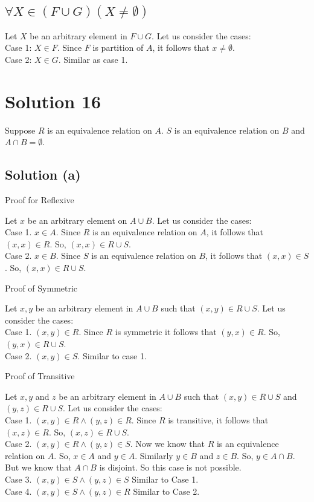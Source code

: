 \documentclass{article}
\begin{document}
\subsection{$\forall X \in (F \cup G)(X \neq \emptyset)$}
Let $X$ be an arbitrary element in $F \cup G$. Let us consider the
cases:
\\ Case 1: $X \in F$. Since $F$ is partition of $A$, it follows that $x
\neq \emptyset$.
\\ Case 2: $X \in G$. Similar as case 1.

\section{Solution 16}
Suppose $R$ is an equivalence relation on $A$. $S$ is an equivalence
relation on $B$ and $A \cap B = \emptyset$.
\subsection{Solution (a)}

Proof for Reflexive

Let $x$ be an arbitrary element on $A \cup B$. Let us consider the
cases:
\\ Case 1. $x \in A$. Since $R$ is an equivalence relation on $A$, it
follows that $(x,x) \in R$. So, $(x,x) \in R \cup S$.
\\ Case 2. $x \in B$. Since $S$ is an equivalence relation on $B$, it
follows that $(x,x) \in S$. So, $(x,x) \in R \cup S$.

\noindent
Proof of Symmetric

Let $x,y$ be an arbitrary element in $A \cup B$ such that $(x,y) \in R
\cup S$. Let us consider the cases:
\\ Case 1. $(x,y) \in R$. Since $R$ is symmetric it follows that
$(y,x) \in R$. So, $(y,x) \in R \cup S$.
\\ Case 2. $(x,y) \in S$. Similar to case 1.

\noindent
Proof of Transitive

Let $x,y$ and $z$ be an arbitrary element in $A \cup B$ such that
$(x,y) \in R \cup S$ and $(y,z) \in R \cup S$. Let us consider the
cases:
\\ Case 1. $(x,y) \in R \land (y,z) \in R$. Since $R$ is transitive,
it follows that $(x,z) \in R$. So, $(x,z) \in R \cup S$.
\\ Case 2. $(x,y) \in R \land (y,z) \in S$. Now we know that $R$ is an
equivalence relation on $A$. So, $x \in A$ and $y \in A$. Similarly $y
\in B$ and $z \in B$. So, $y \in A \cap B$. But we know that $A \cap
B$ is disjoint. So this case is not possible.
\\ Case 3. $(x,y) \in S \land (y,z) \in S$ Similar to Case 1.
\\ Case 4. $(x,y) \in S \land (y,z) \in R$ Similar to Case 2.
\end{document}
